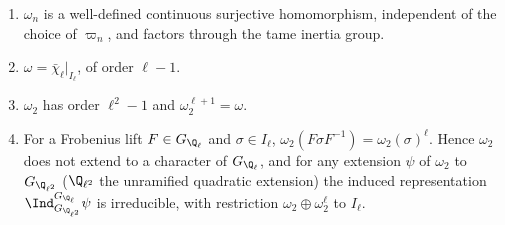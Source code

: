 \begin{proposition}\label{prop:galrep:fundamental-characters}
\begin{enumerate}[label=(\roman*)]
\item $\omega_n$ is a well-defined continuous surjective homomorphism, independent of the choice of $\varpi_n$, and factors through the tame
inertia group.
\item $\omega=\bar\chi_\ell|_{I_\ell}$, of order $\ell-1$.
\item $\omega_2$ has order $\ell^2-1$ and $\omega_2^{\ell+1}=\omega$.
\item For a Frobenius lift $F\in G_{\Q_\ell}$ and $\sigma\in I_\ell$, $\omega_2(F\sigma F^{-1})=\omega_2(\sigma)^\ell$. Hence $\omega_2$ does not extend to a character of $G_{\Q_\ell}$,
and for any extension $\psi$ of $\omega_2$ to $G_{\Q_{\ell^2}}$ ($\Q_{\ell^2}$ the unramified quadratic extension) the induced representation
$\Ind_{G_{\Q_{\ell^2}}}^{G_{\Q_\ell}}\psi$ is irreducible, with restriction $\omega_2\oplus\omega_2^\ell$ to $I_\ell$.
\end{enumerate}
\end{proposition}

